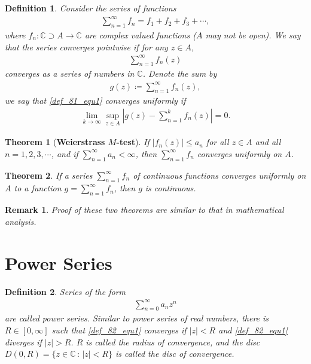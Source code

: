 \documentclass[11pt]{book}
\newtheorem{definition}{Definition}[chapter]
\newtheorem{theorem}{Theorem}[chapter]
\newtheorem{remark}{Remark}[chapter]
\theoremstyle{definition}
\numberwithin{equation}{chapter}
\begin{document}
\begin{definition}
Consider the series of functions
\begin{align}\label{def_81_equ1}
    \sum^\infty_{n=1} f_n = f_1 + f_2 + f_3 + \cdots,
\end{align}
where $f_n: \mathbb{C} \supset A \to \mathbb{C}$ are complex valued functions ($A$ may not be open). We say that the series converges pointwise if for any $z \in A$, 
\begin{align*}
    \sum^\infty_{n=1} f_n(z)
\end{align*}
converges as a series of numbers in $\mathbb{C}$. Denote the sum by
\begin{align*}
    g(z) \coloneqq \sum^\infty_{n=1} f_n(z),
\end{align*}
we say that \eqref{def_81_equ1} converges uniformly if 
\begin{align*}
    \lim_{k \to \infty} \sup_{z \in A} \left|g(z) - \sum^k_{n=1} f_n(z)\right| = 0.
\end{align*}
\end{definition}

\medskip

\begin{theorem}[{\bf Weierstrass $M$-test}]\label{th_81}
If $\left|f_n(z)\right| \leq a_n$ for all $z \in A$ and all $n = 1,2,3,\cdots$, and if $\sum^\infty_{n=1} a_n < \infty$, then $\sum^\infty_{n=1} f_n$ converges uniformly on $A$.
\end{theorem}

\medskip

\begin{theorem}\label{th_82}
If a series $\sum^\infty_{n=1} f_n$ of continuous functions converges uniformly on $A$ to a function $g = \sum^\infty_{n=1} f_n$, then $g$ is continuous.
\end{theorem}

\begin{remark}
Proof of these two theorems are similar to that in mathematical analysis.
\end{remark}

\medskip

\section{Power Series}

\begin{definition}
Series of the form 
\begin{align}\label{def_82_equ1}
    \sum^\infty_{n=0} a_n z^n
\end{align}
are called power series. Similar to power series of real numbers, there is $R \in [0,\infty]$ such that \eqref{def_82_equ1} converges if $\left|z\right| < R$ and \eqref{def_82_equ1} diverges if $\left|z\right| > R$. $R$ is called the radius of convergence, and the disc $D(0,R) = \{z \in \mathbb{C} \,:\, \left|z\right| < R\}$ is called the disc of convergence. 
\end{definition}
\end{document}
